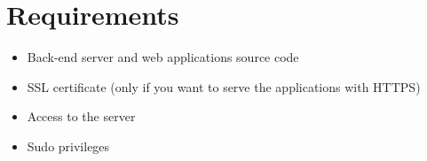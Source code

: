 \section{Requirements}

\begin{itemize}
    \item Back-end server and web applications source code
    \item SSL certificate (only if you want to serve the applications with HTTPS)
    \item Access to the server
    \item Sudo privileges
\end{itemize}
